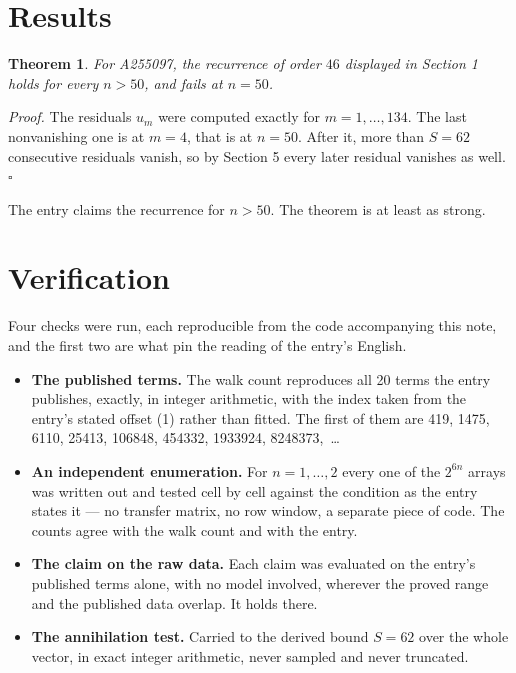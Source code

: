 \documentclass[11pt]{article}
\newtheorem{theorem}{Theorem}
\theoremstyle{definition}
\begin{document}
\section{Results}

\begin{theorem} For A255097, the recurrence of order $46$ displayed in Section 1 holds for every $n > 50$, and fails at $n = 50$.\end{theorem}

{\itshape Proof.} The residuals $u_m$ were computed exactly for $m = 1,\dots,134$. The last nonvanishing one is at $m = 4$, that is at $n = 50$. After it, more than $S = 62$ consecutive residuals vanish, so by Section 5 every later residual vanishes as well. $\square$

The entry claims the recurrence for $n > 50$. The theorem is at least as strong.

\section{Verification}

Four checks were run, each reproducible from the code accompanying this note, and the first two are what pin the reading of the entry's English.

\begin{itemize}

\item {\bfseries The published terms.} The walk count reproduces all 20 terms the entry publishes, exactly, in integer arithmetic, with the index taken from the entry's stated offset (1) rather than fitted. The first of them are 419, 1475, 6110, 25413, 106848, 454332, 1933924, 8248373,~\dots

\item {\bfseries An independent enumeration.} For $n = 1,\dots,2$ every one of the $2^{6n}$ arrays was written out and tested cell by cell against the condition as the entry states it --- no transfer matrix, no row window, a separate piece of code. The counts agree with the walk count and with the entry.

\item {\bfseries The claim on the raw data.} Each claim was evaluated on the entry's published terms alone, with no model involved, wherever the proved range and the published data overlap. It holds there.

\item {\bfseries The annihilation test.} Carried to the derived bound $S = 62$ over the whole vector, in exact integer arithmetic, never sampled and never truncated.

\end{itemize}
\end{document}
